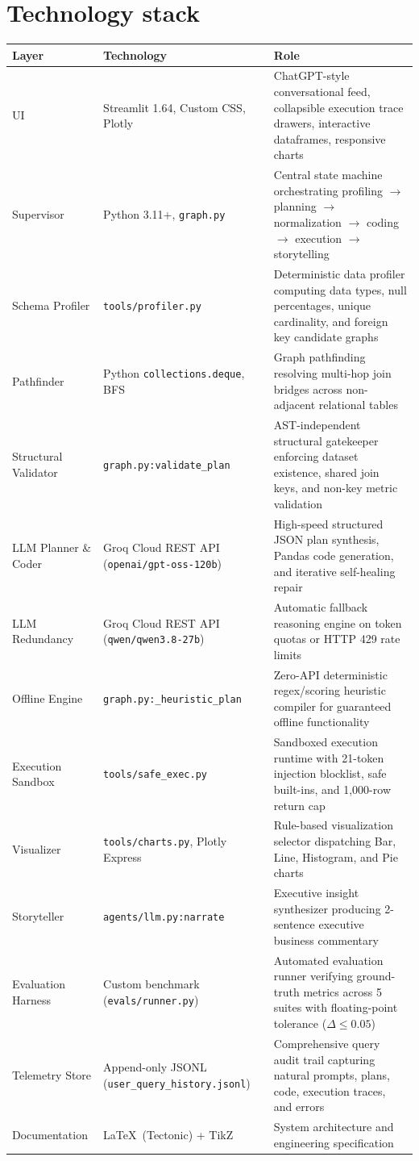 \documentclass[11pt,a4paper]{article}
\begin{document}
\section{Technology stack}
{\footnotesize
\begin{center}
\begin{tabular}{@{}lp{4.4cm}p{7.4cm}@{}}
\toprule
Layer & Technology & Role \\
\midrule
UI & Streamlit 1.64, Custom CSS, Plotly & ChatGPT-style conversational feed, collapsible execution trace drawers, interactive dataframes, responsive charts \\
Supervisor & Python 3.11+, \texttt{graph.py} & Central state machine orchestrating profiling $\rightarrow$ planning $\rightarrow$ normalization $\rightarrow$ coding $\rightarrow$ execution $\rightarrow$ storytelling \\
Schema Profiler & \texttt{tools/profiler.py} & Deterministic data profiler computing data types, null percentages, unique cardinality, and foreign key candidate graphs \\
Pathfinder & Python \texttt{collections.deque}, BFS & Graph pathfinding resolving multi-hop join bridges across non-adjacent relational tables \\
Structural Validator & \texttt{graph.py:validate\_plan} & AST-independent structural gatekeeper enforcing dataset existence, shared join keys, and non-key metric validation \\
LLM Planner \& Coder & Groq Cloud REST API (\texttt{openai/gpt-oss-120b}) & High-speed structured JSON plan synthesis, Pandas code generation, and iterative self-healing repair \\
LLM Redundancy & Groq Cloud REST API (\texttt{qwen/qwen3.8-27b}) & Automatic fallback reasoning engine on token quotas or HTTP 429 rate limits \\
Offline Engine & \texttt{graph.py:\_heuristic\_plan} & Zero-API deterministic regex/scoring heuristic compiler for guaranteed offline functionality \\
Execution Sandbox & \texttt{tools/safe\_exec.py} & Sandboxed execution runtime with 21-token injection blocklist, safe built-ins, and 1,000-row return cap \\
Visualizer & \texttt{tools/charts.py}, Plotly Express & Rule-based visualization selector dispatching Bar, Line, Histogram, and Pie charts \\
Storyteller & \texttt{agents/llm.py:narrate} & Executive insight synthesizer producing 2-sentence executive business commentary \\
Evaluation Harness & Custom benchmark (\texttt{evals/runner.py}) & Automated evaluation runner verifying ground-truth metrics across 5 suites with floating-point tolerance ($\Delta \le 0.05$) \\
Telemetry Store & Append-only JSONL (\texttt{user\_query\_history.jsonl}) & Comprehensive query audit trail capturing natural prompts, plans, code, execution traces, and errors \\
Documentation & \LaTeX\ (Tectonic) + TikZ & System architecture and engineering specification \\
\bottomrule
\end{tabular}
\end{center}
}
\end{document}
